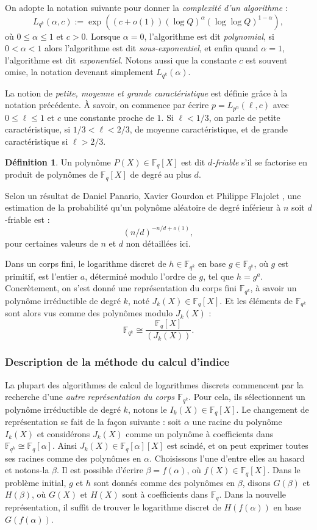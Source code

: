 \documentclass[a4paper, titlepage, 11pt]{article}
\theoremstyle{definition}
\newtheorem{defi}[theo]{Définition}
\theoremstyle{remark}
\def\o{o}
\def\gf #1{\mathbb{F}_{#1}}
\begin{document}
On adopte la notation suivante pour donner la \textit{complexité d'un algorithme} :
$$L_{q^k}(\alpha, c) := \exp\left({(c+\o(1))(\log Q)^\alpha(\log\log Q)^{1 - \alpha}}\right),$$
où $0 \leqslant \alpha\leqslant 1$ et $c > 0$. Lorsque $\alpha = 0$, l'algorithme est dit \textit{polynomial}, si $0 < \alpha < 1$ alors l'algorithme est dit \textit{sous-exponentiel}, et enfin quand $\alpha = 1$, l'algorithme est dit \textit{exponentiel}. Notons aussi que la constante $c$ est souvent omise, la notation devenant simplement $L_{q^k}(\alpha)$.

La notion de \textit{petite, moyenne et grande caractéristique} est définie grâce à la notation précédente. À savoir, on commence par écrire $p = L_{p^n}(\ell,c)$ avec $0\leqslant\ell\leqslant 1$ et $c$ une constante proche de $1$. Si $\ell < 1/3$, on parle de petite caractéristique, si $1/3 < \ell < 2/3$, de moyenne caractéristique, et de grande caractéristique si $\ell > 2/3$.

\begin{defi}
Un polynôme $P(X) \in \gf{q}[X]$ est dit \textit{$d$-friable} s'il se factorise en produit de polynômes de $\gf{q}[X]$ de degré au plus $d$.
\end{defi}

Selon un résultat de Daniel Panario, Xavier Gourdon et Philippe Flajolet \cite{PGF98}, une estimation de la probabilité qu'un polynôme aléatoire de degré inférieur à $n$ soit $d$-friable est :
$${(n/d)}^{-n/d + \o(1)},$$
pour certaines valeurs de $n$ et $d$ non détaillées ici.

Dans un corps fini, le logarithme discret de $h \in \gf{q^k}$ en base $g \in \gf{q^k}$, où $g$ est primitif, est l'entier $a$, déterminé modulo l'ordre de $g$, tel que $h = g^a$. Concrètement, on s'est donné une représentation du corps fini $\gf{q^k}$, à savoir un polynôme irréductible de degré $k$, noté $J_k(X) \in \gf{q}[X]$. Et les éléments de $\gf{q^k}$ sont alors vus comme des polynômes modulo $J_k(X)$ :
$$\gf{q^k} \cong \frac{\gf{q}[X]}{(J_k(X))}.$$

\subsubsection{Description de la méthode du calcul d'indice}
La plupart des algorithmes de calcul de logarithmes discrets commencent par la recherche d'une \textit{autre représentation du corps $\gf{q^k}$}. Pour cela, ils sélectionnent un polynôme irréductible de degré $k$, notons le $I_k(X) \in \gf{q}[X]$. Le changement de représentation se fait de la façon suivante : soit $\alpha$ une racine du polynôme $I_k(X)$ et considérons $J_k(X)$ comme un polynôme à coefficients dans $\gf{q^k} \cong \gf{q}[\alpha]$. Ainsi $J_k(X) \in \gf{q}[\alpha][X]$ est scindé, et on peut exprimer toutes ses racines comme des polynômes en $\alpha$. Choisissons l'une d'entre elles au hasard et notons-la $\beta$. Il est possible d'écrire $\beta = f(\alpha)$, où $f(X) \in \gf{q}[X]$. Dans le problème initial, $g$ et $h$ sont donnés comme des polynômes en $\beta$, disons $G(\beta)$ et $H(\beta)$, où $G(X)$ et $H(X)$ sont à coefficients dans $\gf{q}$. Dans la nouvelle représentation, il suffit de trouver le logarithme discret de $H(f(\alpha))$ en base $G(f(\alpha))$.
\end{document}
